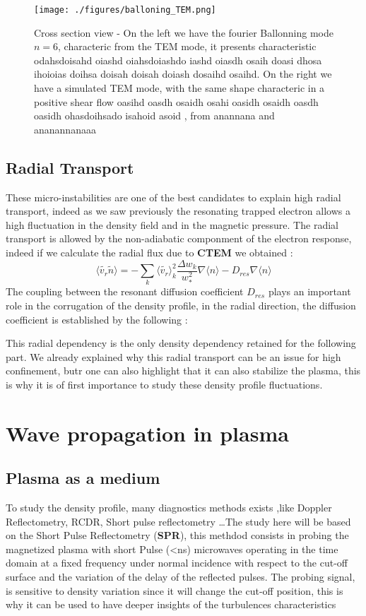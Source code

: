 \documentclass[11pt,a4paper]{report}
\begin{document}
\begin{figure}[H]
    \centering
    \texttt{[image: ./figures/balloning\_TEM.png]}
    \caption{Cross section view - On the left we have the fourier Ballonning mode $n = 6$, characteric from the TEM mode, it presents characteristic odahsdoisahd oiashd oiahsdoiashdo iashd oiasdh osaih doasi dhosa ihoioias doihsa doisah doisah doiash dosaihd osaihd. On the right we have a simulated TEM mode, with the same shape characteric in a positive shear flow oasihd oasdh osaidh osahi oasidh osaidh oasdh oasidh ohasdoihsado isahoid asoid , from anannana and ananannanaaa}
    \label{}
\end{figure}
\begin{multicols}{2}
    \subsection{Radial Transport}
    These micro-instabilities are one of the best candidates to explain high radial transport, indeed as we saw previously the resonating trapped electron allows a high fluctuation in the density field and in the magnetic pressure. The radial transport is allowed by the non-adiabatic componment of the electron response, indeed if we calculate the radial flux due to \textbf{CTEM} we obtained :
    $$\langle\tilde{v_r}\tilde{n} \rangle = -\sum_{k}\langle\tilde{v_r}\rangle_k^2\frac{\Delta w_k}{w_*^2} \nabla \langle n \rangle - D_{res} \nabla \langle n \rangle $$
    The coupling between the resonant diffusion coefficient $D_{res}$ plays an important role in the corrugation of the density profile, in the radial direction, the diffusion coefficient is established by the following :

    This radial dependency is the only density dependency retained for the following part. We already explained why this radial transport can be an issue for high confinement, butr one can also highlight that it can also stabilize the plasma, this is why it is of first importance to study these density profile fluctuations.
    \section{Wave propagation in plasma}
    \subsection{Plasma as a medium}
    To study the density profile, many diagnostics methods exists ,like Doppler Reflectometry, RCDR, Short pulse reflectometry \dots The study here will be based on the Short Pulse Reflectometry (\textbf{SPR}), this methdod consists in probing the magnetized plasma with short Pulse (<ns) microwaves operating in the time domain at a fixed frequency under normal incidence with respect to the cut-off surface and the variation of the delay of the reflected pulses. The probing signal, is sensitive to density variation since it will change the cut-off position, this is why it can
    be used to have deeper insights of the turbulences characteristics

\end{multicols}
\end{document}
